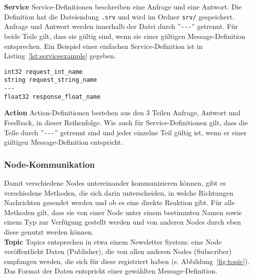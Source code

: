 \textbf{Service} Service-Definitionen beschreiben eine Anfrage und eine Antwort.
Die Definition hat die Dateiendung \verb|.srv| und wird im Ordner \verb|srv/| gespeichert.
Anfrage und Antwort werden innerhalb der Datei durch ''\verb|---|'' getrennt.
Für beide Teile gilt, dass sie gültig sind, wenn sie einer gültigen Message-Definition entsprechen.
Ein Beispiel einer einfachen Service-Definition ist in Listing~\ref{lst:serviceexample} gegeben.\\
\begin{minipage}{\linewidth}%
\begin{lstlisting}[caption={Beispiel einer Service-Definition}, label={lst:serviceexample}]
int32 request_int_name
string request_string_name
---
float32 response_float_name
\end{lstlisting}
\end{minipage}

\textbf{Action} Action-Definitionen bestehen aus den 3 Teilen Anfrage, Antwort und Feedback, in dieser Reihenfolge.
Wie auch für Service-Definitionen gilt, dass die Teile durch ''\verb|---|'' getrennt sind und jeder einzelne Teil gültig ist, wenn er einer gültigen Message-Definition entspricht.

\subsubsection{Node-Kommunikation}{\label{rosnodecomm}}
Damit verschiedene Nodes untereinander kommunizieren können, gibt es verschiedene Methoden, die sich darin unterscheiden, in welche Richtungen Nachrichten gesendet werden und ob es eine direkte Reaktion gibt.
Für alle Methoden gilt, dass sie von einer Node unter einem bestimmten Namen sowie einem Typ zur Verfügung gestellt werden und von anderen Nodes durch eben diese genutzt werden können.\\

\textbf{Topic} Topics entsprechen in etwa einem Newsletter System: eine Node veröffentlicht Daten (Publisher), die von allen anderen Nodes (Subscriber) empfangen werden, die sich für diese registriert haben (s. Abbildung~\ref{fig:topic}).
Das Format der Daten entspricht einer gewählten Message-Definition.\\

